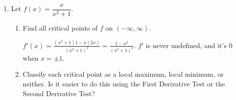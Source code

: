 \documentclass{article}
\begin{document}
\begin{enumerate}
\begin{solution}
\begin{enumerate}[label=\arabic*.]
        To fully answer the problem, we need to determine the value of $h$ that corresponds
        to this value of $r$. Since $h=\frac{2000}{r^2}$, when $r=10$, $h=20$. So the
        dimensions of the can that minimize the amount of steel needed are a radius of $10$
        cm and a height of $20$ cm.
      \end{enumerate}  
  \end{solution}

\item  \label{x/(x^2+1)}

  Let $f(x) = \dfrac{x}{x^2 + 1}$.
  \begin{enumerate}
  \item
    \begin{problem}[\vfill]
      Find all critical points of $f$ on $(-\infty, \infty)$.
    \end{problem}

    \begin{solution}
      $\displaystyle f'(x) = \frac{(x^2 + 1) 1 - x (2x)}{(x^2 + 1)^2} = \frac{1 - x^2}{(x^2 + 1)^2}$. $f'$ is never undefined, and it's 0 when $x = \boxed{\pm 1}$.
    \end{solution}

  \item
    \begin{problem}[\vfill]
      Classify each critical point as a local maximum, local minimum, or neither. Is it easier to do this using the First Derivative Test or the Second Derivative Test?
    \end{problem}


\end{enumerate}
\end{enumerate}
\end{document}
